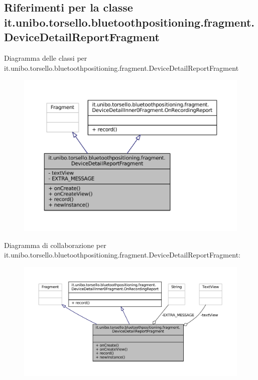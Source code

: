 \hypertarget{classit_1_1unibo_1_1torsello_1_1bluetoothpositioning_1_1fragment_1_1DeviceDetailReportFragment}{}\subsection{Riferimenti per la classe it.\+unibo.\+torsello.\+bluetoothpositioning.\+fragment.\+Device\+Detail\+Report\+Fragment}
\label{classit_1_1unibo_1_1torsello_1_1bluetoothpositioning_1_1fragment_1_1DeviceDetailReportFragment}


Diagramma delle classi per it.\+unibo.\+torsello.\+bluetoothpositioning.\+fragment.\+Device\+Detail\+Report\+Fragment
\nopagebreak
\begin{figure}[H]
\begin{center}
\leavevmode
\includegraphics[width=350pt]{classit_1_1unibo_1_1torsello_1_1bluetoothpositioning_1_1fragment_1_1DeviceDetailReportFragment__inherit__graph}
\end{center}
\end{figure}


Diagramma di collaborazione per it.\+unibo.\+torsello.\+bluetoothpositioning.\+fragment.\+Device\+Detail\+Report\+Fragment\+:
\nopagebreak
\begin{figure}[H]
\begin{center}
\leavevmode
\includegraphics[width=350pt]{classit_1_1unibo_1_1torsello_1_1bluetoothpositioning_1_1fragment_1_1DeviceDetailReportFragment__coll__graph}
\end{center}
\end{figure}
